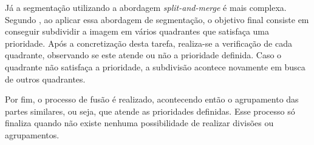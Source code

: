 Já a segmentação utilizando a abordagem \textit{split-and-merge} é mais complexa. Segundo , ao aplicar essa abordagem de segmentação, o objetivo final consiste em conseguir subdividir a imagem em vários quadrantes que satisfaça uma prioridade. Após a concretização desta tarefa, realiza-se a verificação de cada quadrante, observando se este atende ou não a prioridade definida. Caso o quadrante não satisfaça a prioridade, a subdivisão acontece novamente em busca de outros quadrantes.

Por fim, o processo de fusão é realizado, acontecendo então o agrupamento das partes similares, ou seja, que atende as prioridades definidas. Esse processo só finaliza quando não existe nenhuma possibilidade de realizar divisões ou agrupamentos.